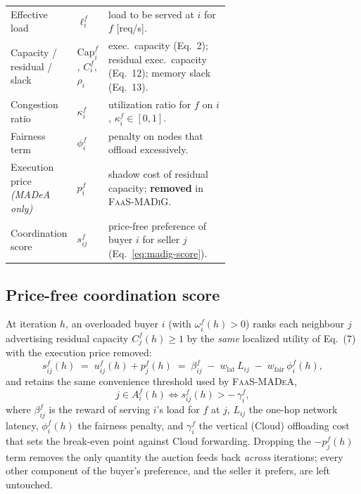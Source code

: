 \begin{table}[t]
\begin{tabular}{@{}l l p{0.62\linewidth}@{}}
Effective load & $\ell_i^f$ & load to be served at $i$ for $f$ [req/s].\\
Capacity / residual / slack & $\mathrm{Cap}_i^f$, $C_i^f$, $\rho_i$ & exec.\ capacity (Eq.~2); residual exec.\ capacity (Eq.~12); memory slack (Eq.~13).\\
Congestion ratio & $\kappa_i^f$ & utilization ratio for $f$ on $i$, $\kappa_i^f\in[0,1]$.\\
Fairness term & $\phi_i^f$ & penalty on nodes that offload excessively.\\
Execution price \emph{(MADeA only)} & $p_i^f$ & shadow cost of residual capacity; \textbf{removed} in \textsc{FaaS-MADiG}.\\
Coordination score & $s_{ij}^f$ & price-free preference of buyer $i$ for seller $j$ (Eq.~\eqref{eq:madig-score}).\\
\bottomrule
\end{tabular}
\end{table}

\subsection{Price-free coordination score}
\label{sec:madig-score}

At iteration $h$, an overloaded buyer $i$ (with $\omega_i^f(h)>0$) ranks each
neighbour $j$ advertising residual capacity $C_j^f(h)\ge 1$ by the
\emph{same} localized utility of Eq.~(7) with the execution price removed:
\begin{equation}
  s_{ij}^f(h)\;=\;u_{ij}^f(h)+p_j^f(h)
  \;=\;\beta_{ij}^f\;-\;w_{\mathrm{lat}}\,L_{ij}\;-\;w_{\mathrm{fair}}\,\phi_i^f(h),
  \label{eq:madig-score}
\end{equation}
and retains the same convenience threshold used by \textsc{FaaS-MADeA},
\begin{equation}
  j\in A_i^f(h)\iff s_{ij}^f(h)>-\,\gamma_i^f,
  \label{eq:madig-threshold}
\end{equation}
where $\beta_{ij}^f$ is the reward of serving $i$'s load for $f$ at $j$,
$L_{ij}$ the one-hop network latency, $\phi_i^f(h)$ the fairness penalty, and
$\gamma_i^f$ the vertical (Cloud) offloading cost that sets the
break-even point against Cloud forwarding. Dropping the $-p_j^f(h)$ term
removes the only quantity the auction feeds back \emph{across} iterations;
every other component of the buyer's preference, and the seller it prefers, are
left untouched.

